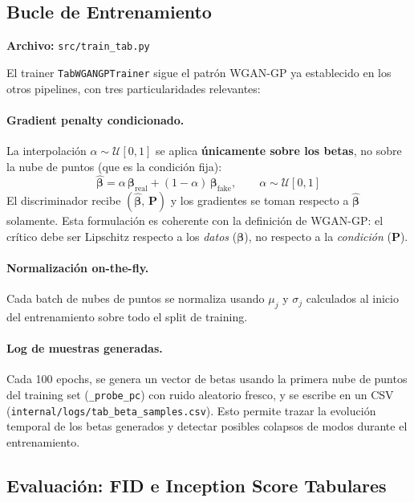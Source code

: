 \documentclass[a4paper,11pt]{article}
\begin{document}
\subsection{Bucle de Entrenamiento}

\textbf{Archivo:} \texttt{src/train\_tab.py}

El trainer \texttt{TabWGANGPTrainer} sigue el patrón WGAN-GP ya establecido
en los otros pipelines, con tres particularidades relevantes:

\paragraph{Gradient penalty condicionado.}
La interpolación $\alpha \sim \mathcal{U}[0,1]$ se aplica \textbf{únicamente
sobre los betas}, no sobre la nube de puntos (que es la condición fija):
\begin{equation}
    \hat{\bm{\beta}} = \alpha\,\bm{\beta}_{\text{real}}
    + (1-\alpha)\,\bm{\beta}_{\text{fake}},
    \qquad \alpha \sim \mathcal{U}[0,1]
\end{equation}
El discriminador recibe $(\hat{\bm{\beta}},\,\bm{P})$ y los gradientes se
toman respecto a $\hat{\bm{\beta}}$ solamente. Esta formulación es coherente
con la definición de WGAN-GP: el crítico debe ser Lipschitz respecto a los
\emph{datos} ($\bm{\beta}$), no respecto a la \emph{condición} ($\bm{P}$).

\paragraph{Normalización on-the-fly.}
Cada batch de nubes de puntos se normaliza usando $\mu_j$ y $\sigma_j$
calculados al inicio del entrenamiento sobre todo el split de training.

\paragraph{Log de muestras generadas.}
Cada 100 epochs, se genera un vector de betas usando la primera nube de
puntos del training set (\texttt{\_probe\_pc}) con ruido aleatorio fresco,
y se escribe en un CSV (\texttt{internal/logs/tab\_beta\_samples.csv}).
Esto permite trazar la evolución temporal de los betas generados y
detectar posibles colapsos de modos durante el entrenamiento.

\subsection{Evaluación: FID e Inception Score Tabulares}
\end{document}
